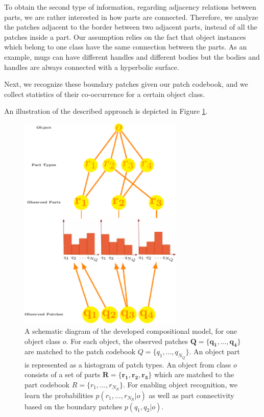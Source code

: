 \documentclass[a4paper,11pt,pdf]{pacmanreport}
\begin{document}
To obtain the second type of information, regarding adjacency relations 
between parts, we are rather interested in how parts are connected. 
Therefore, we analyze the patches adjacent to the border between two adjacent 
parts, instead of all the patches inside a part. Our assumption relies on the 
fact that object instances which belong to one class have the same connection 
between the parts. As an example, mugs can have different handles and different 
bodies but the bodies and handles are always connected with a hyperbolic 
surface.

Next, we recognize these boundary patches given our patch codebook,
and we collect statistics of their co-occurrence for a certain object
class.

An illustration of the described approach is depicted in Figure \ref{fig:rel}.

\begin{figure}[h!]
\begin{center}
\includegraphics[width=0.7\textwidth]{rel.pdf}
\end{center}
\caption{A schematic diagram of the developed compositional model, for one object class $o$. For each object, the observed patches 
$\mathbf{Q}=\{\mathbf{q_1},\ldots,\mathbf{q_4}\}$ are matched to the patch 
codebook $Q=\{q_1,\ldots,q_{N_{Q}}\}$. An object part is represented as a 
histogram of patch types. An object from class $o$ consists of a set of parts 
$\mathbf{R}=\{\mathbf{r_1},\mathbf{r_2},\mathbf{r_3}\}$ which are matched to the 
part codebook $R=\{r_1,\ldots,r_{N_{R}}\}$. For enabling object recognition, we 
learn the probabilities $p(r_1,\ldots,r_{N_{R}} \vert o)$ as well as part 
connectivity based on the boundary patches $p(q_{1},q_{2} \vert o)$.} 
\label{fig:rel}
\end{figure}
\end{document}
